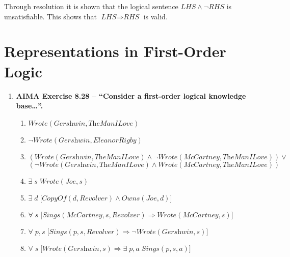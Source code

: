 \begin{enumerate}
\begin{enumerate}
Through resolution it is shown that the logical sentence $\textit{LHS} \land \neg \textit{RHS}$ is unsatisfiable. This shows that $\textit{LHS} \Rightarrow \textit{RHS}$ is valid.

\end{enumerate}

\end{enumerate}

\section{Representations in First-Order Logic}

\begin{enumerate}

\item \textbf{AIMA Exercise 8.28 -- ``Consider a first-order logical knowledge base\ldots''.}

\begin{enumerate}

\item
$\textit{Wrote}(\textit{Gershwin}, \textit{TheManILove})$

\item
$\neg \textit{Wrote}(\textit{Gershwin}, \textit{EleanorRigby})$

\item
$(\textit{Wrote}(\textit{Gershwin}, \textit{TheManILove}) \land \neg \textit{Wrote}(\textit{McCartney}, \textit{TheManILove})) \lor$\\
$(\neg \textit{Wrote}(\textit{Gershwin}, \textit{TheManILove}) \land \textit{Wrote}(\textit{McCartney}, \textit{TheManILove}))$

\item
$\exists \; s \; \textit{Wrote}(\textit{Joe}, s)$

\item
$\exists \; d \; \big[ \textit{CopyOf}(d, \textit{Revolver}) \land \textit{Owns}(\textit{Joe}, d) \big]$

\item
$\forall \; s \; \big[ \textit{Sings}(\textit{McCartney}, s, \textit{Revolver}) \Rightarrow \textit{Wrote}(\textit{McCartney}, s) \big]$

\item
$\forall \; p, s \; \big[ \textit{Sings}(p, s, \textit{Revolver}) \Rightarrow \neg \textit{Wrote}(\textit{Gershwin}, s) \big]$

\item
$\forall \; s \; \big[ \textit{Wrote}(\textit{Gershwin}, s) \Rightarrow \exists \; p, a \; \textit{Sings}(p, s, a) \big]$


\end{enumerate}
\end{enumerate}
